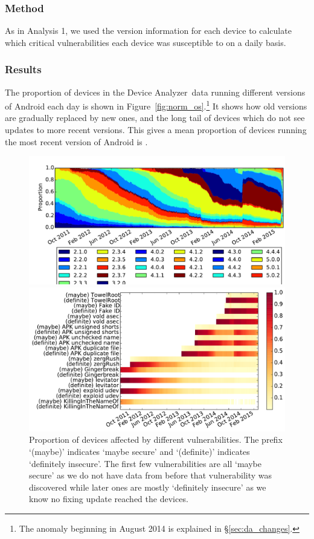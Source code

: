\documentclass{llncs}
\newcommand{\da}{Device Analyzer}
\begin{document}
\subsubsection{Method} As in Analysis 1, we used the version information for each device to calculate which critical vulnerabilities each device was susceptible to on a daily basis.

\subsubsection{Results}
The proportion of devices in the \da\ data running different versions of Android each day is shown in Figure~\ref{fig:norm_os}.\footnote{The anomaly beginning in August 2014 is explained in \S\ref{sec:da_changes}.}
It shows how old versions are gradually replaced by new ones, and the long tail of devices which do not see updates to more recent versions.
This gives a mean proportion of devices running the most recent version of Android is \daUpdatednessPerc.


\begin{figure}[!h]
 \centering
 \includegraphics[width=\textwidth]{figures/da_norm_os}
 \caption{Android versions in \da\ data over time. The anomaly beginning in August 2014 is explained in \S\ref{sec:da_changes}.}
 \label{fig:norm_os}
 \includegraphics[width=\textwidth]{figures/nvulnerabilities_heat.pdf}
 \caption{Proportion of devices affected by different vulnerabilities. The prefix `(maybe)' indicates `maybe secure' and `(definite)' indicates `definitely insecure'. The first few vulnerabilities are all `maybe secure' as we do not have data from before that vulnerability was discovered while later ones are mostly `definitely insecure' as we know no fixing update reached the devices.
 }
 \label{fig:nvulnerabilities_heat}
\end{figure}
\end{document}
